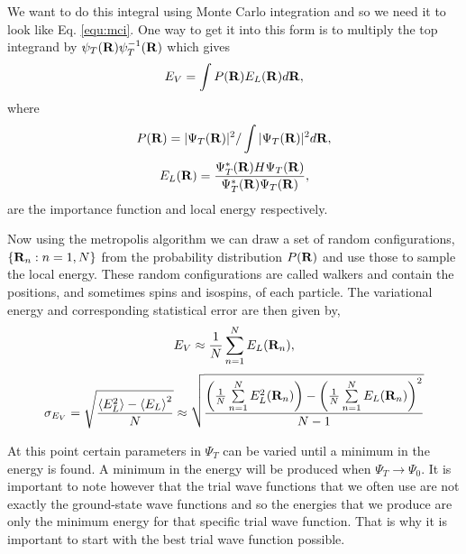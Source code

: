 We want to do this integral using Monte Carlo integration and so we need it to look like Eq. \ref{equ:mci}. One way to get it into this form is to multiply the top integrand by $\psi_T(\mathbf{R})\psi_T^{-1}(\mathbf{R})$ which gives
\begin{equation} 
  E_V = \int P(\mathbf{R}) E_L(\mathbf{R}) d\mathbf{R},
\end{equation} 
where
\begin{equation}
   P(\mathbf{R}) = |\Psi_T(\mathbf{R})|^2/\int|\Psi_T(\mathbf{R})|^2d\mathbf{R},
\end{equation}
\begin{equation}
   E_L(\R) = \frac{\Psi_T^*(\R)H\Psi_T(\R)}{\Psi_T^*(\R)\Psi_T(\R)},%
\end{equation}
are the importance function and local energy respectively.

Now using the metropolis algorithm we can draw a set of random configurations, $\{\mathbf{R}_n: n=1,N\}$ from the probability distribution $P(\mathbf{R})$ and use those to sample the local energy. These random configurations are called walkers and contain the positions, and sometimes spins and isospins, of each particle. The variational energy and corresponding statistical error are then given by,
\begin{equation} 
  E_V \approx \frac{1}{N} \sum\limits_{n=1}^N E_L({\mathbf{R}_n}),
\end{equation}
\begin{equation} 
  \sigma_{E_V} = \sqrt{\frac{\left<E_L^2\right>-\left<E_L\right>^2}{N}} \approx \sqrt{\frac{\left(\frac{1}{N}\sum\limits_{n=1}^NE_L^2(\mathbf{R}_n)\right) - \left(\frac{1}{N}\sum\limits_{n=1}^NE_L(\mathbf{R}_n)\right)^2}{N-1}}
\end{equation}

At this point certain parameters in $\Psi_T$ can be varied until a minimum in the energy is found. A minimum in the energy will be produced when $\Psi_T \rightarrow \Psi_0$. It is important to note however that the trial wave functions that we often use are not exactly the ground-state wave functions and so the energies that we produce are only the minimum energy for that specific trial wave function. That is why it is important to start with the best trial wave function possible.

